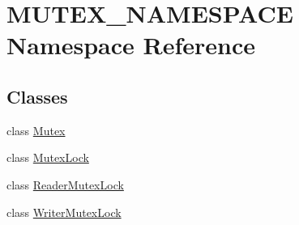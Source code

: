 \hypertarget{namespaceMUTEX__NAMESPACE}{}\section{M\+U\+T\+E\+X\+\_\+\+N\+A\+M\+E\+S\+P\+A\+CE Namespace Reference}
\label{namespaceMUTEX__NAMESPACE}
\subsection*{Classes}
\begin{DoxyCompactItemize}
\item 
class \hyperlink{classMUTEX__NAMESPACE_1_1Mutex}{Mutex}
\item 
class \hyperlink{classMUTEX__NAMESPACE_1_1MutexLock}{Mutex\+Lock}
\item 
class \hyperlink{classMUTEX__NAMESPACE_1_1ReaderMutexLock}{Reader\+Mutex\+Lock}
\item 
class \hyperlink{classMUTEX__NAMESPACE_1_1WriterMutexLock}{Writer\+Mutex\+Lock}
\end{DoxyCompactItemize}

